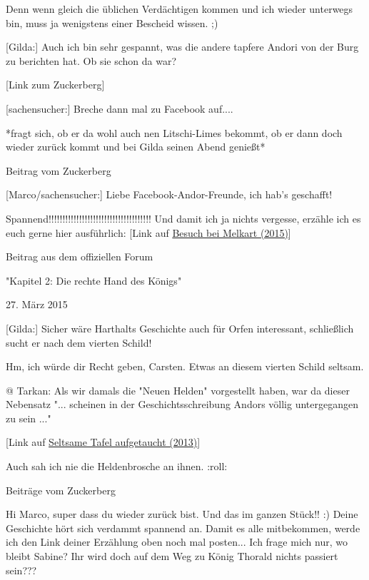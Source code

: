 \documentclass[10pt, a4paper, oneside]{book}
\newcommand{\refstorytext}[1]{\hyperref[Storytext: #1]{#1}}
\begin{document}
\begin{multicols}{2}
Denn wenn gleich die üblichen Verdächtigen kommen und ich wieder unterwegs bin, muss ja wenigstens einer Bescheid wissen. ;) 

[Gilda:] Auch ich bin sehr gespannt, was die andere tapfere Andori von der Burg zu berichten hat. Ob sie schon da war?

[Link zum Zuckerberg]

[sachensucher:] Breche dann mal zu Facebook auf....

*fragt sich, ob er da wohl auch nen Litschi-Limes bekommt, ob er dann doch wieder zurück kommt und bei Gilda seinen Abend genießt*

\begin{center}
    Beitrag vom Zuckerberg
\end{center}

[Marco/sachensucher:] Liebe Facebook-Andor-Freunde, ich hab's geschafft! 

Spannend!!!!!!!!!!!!!!!!!!!!!!!!!!!!!!!!!!!!! Und damit ich ja nichts vergesse, erzähle ich es euch gerne hier ausführlich: [Link auf \refstorytext{Besuch bei Melkart (2015)}] 


\begin{center}
    Beitrag aus dem offiziellen Forum

    "Kapitel 2: Die rechte Hand des Königs"

    27. März 2015
\end{center}

[Gilda:] Sicher wäre Harthalts Geschichte auch für Orfen interessant, schließlich sucht er nach dem vierten Schild!

Hm, ich würde dir Recht geben, Carsten. Etwas an diesem vierten Schild seltsam.

@ Tarkan: Als wir damals die "Neuen Helden" vorgestellt haben, war da dieser Nebensatz "... scheinen in der Geschichtsschreibung Andors völlig untergegangen zu sein ..."

[Link auf \refstorytext{Seltsame Tafel aufgetaucht (2013)}]

Auch sah ich nie die Heldenbrosche an ihnen. :roll: 

\begin{center}
    Beiträge vom Zuckerberg
\end{center}

Hi Marco, super dass du wieder zurück bist. Und das im ganzen Stück!! :) Deine Geschichte hört sich verdammt spannend an. Damit es alle mitbekommen, werde ich den Link deiner Erzählung oben noch mal posten... Ich frage mich nur, wo bleibt Sabine? Ihr wird doch auf dem Weg zu König Thorald nichts passiert sein???


\end{multicols}
\end{document}
